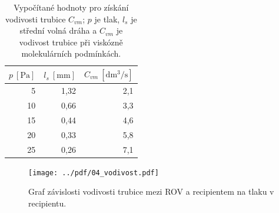 \documentclass[english]{article}
\newcommand{\unit}[1]{\mathrm{#1}}
\begin{document}
\begin{table}[h!]
	\centering
	\begin{tabular}{|r|r|r|}
		\hline
		$p~\unit{[Pa]}$ & $l_s~\unit{[mm]}$ & $C_{vm}~\unit{[dm^3/s]}$ \bigstrut\\
		\hline
		5     & 1,32  & 2,1 \bigstrut\\
		\hline
		10    & 0,66  & 3,3 \bigstrut\\
		\hline
		15    & 0,44  & 4,6 \bigstrut\\
		\hline
		20    & 0,33  & 5,8 \bigstrut\\
		\hline
		25    & 0,26  & 7,1 \bigstrut\\
		\hline
	\end{tabular}%
	
	\caption{Vypočítané hodnoty pro získání vodivosti trubice $C_{vm} $; $ p $ je tlak, $ l_s $ je střední volná dráha a $C_{vm} $ je vodivost trubice při viskózně molekulárních podmínkách.}
	\label{tab:vodivost}
	
\end{table}

\begin{figure}[h!]
	\begin{center}
		\vspace*{-1cm}
		\texttt{[image: ../pdf/04\_vodivost.pdf]}
		\vspace*{-0,7cm}
		\caption{Graf závislosti vodivosti trubice mezi ROV a recipientem na tlaku v recipientu.}
		\label{graf_vodivost}
	\end{center}
\end{figure}
\end{document}

